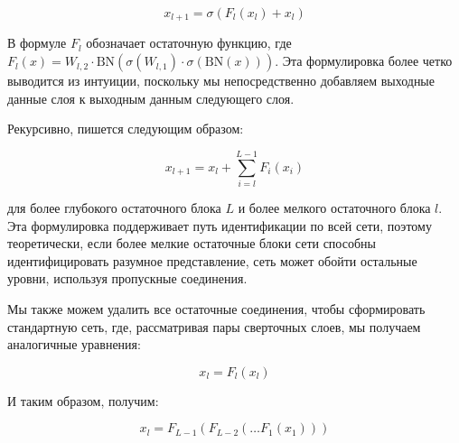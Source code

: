\[
    x_{l + 1} = \sigma(F_{l}(x_{l}) + x_{l})
\]

В формуле \(F_{l}\) обозначает остаточную функцию, где \(F_{l}(x) = W_{l,2} \cdot \text{BN}(\sigma(W_{l,1}) \cdot \sigma(\text{BN}(x)))\). Эта формулировка более четко выводится из интуиции, поскольку мы непосредственно добавляем выходные данные слоя к выходным данным следующего слоя.

Рекурсивно, пишется следующим образом:

\[
    x_{l + 1} = x_{l} + \sum_{i = l}^{L - 1} F_{i}(x_{i})
\]

для более глубокого остаточного блока \(L\) и более мелкого остаточного блока \(l\). Эта формулировка поддерживает путь идентификации по всей сети, поэтому теоретически, если более мелкие остаточные блоки сети способны идентифицировать разумное представление, сеть может обойти остальные уровни, используя пропускные соединения.

Мы также можем удалить все остаточные соединения, чтобы сформировать стандартную сеть, где, рассматривая пары сверточных слоев, мы получаем аналогичные уравнения:

\[
    x_{l} = F_{l}(x_{l})
\]

И таким образом, получим:

\[
    x_{l} = F_{L - 1}(F_{L - 2}(\ldots F_{1}(x_{1})))
\]